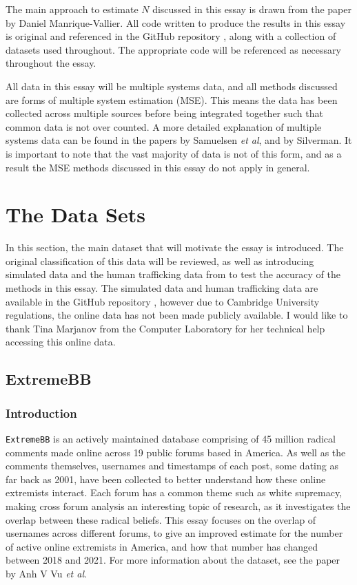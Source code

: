 \documentclass[10pt,a4paper,notitlepage]{article}
\begin{document}
The main approach to estimate $N$ discussed in this essay is drawn from the paper \cite{BayesianMixing} by Daniel Manrique-Vallier. All code written to produce the results in this essay is original and referenced in the GitHub repository \cite{Jonah}, along with a collection of datasets used throughout. The appropriate code will be referenced as necessary throughout the essay. 

All data in this essay will be multiple systems data, and all methods discussed are forms of multiple system estimation (MSE). This means the data has been collected across multiple sources before being integrated together such that common data is not over counted. A more detailed explanation of multiple systems data can be found in the papers \cite{Systems} by Samuelsen \textit{et al}, and \cite{Silver} by Silverman. It is important to note that the vast majority of data is not of this form, and as a result the MSE methods discussed in this essay do not apply in general.
\section{The Data Sets}\label{sc:2}
In this section, the main dataset that will motivate the essay is introduced. The original classification of this data will be reviewed, as well as introducing simulated data and the human trafficking data from \cite{Silver} to test the accuracy of the methods in this essay. The simulated data and human trafficking data are available in the GitHub repository \cite{Jonah}, however due to Cambridge University regulations, the online data has not been made publicly available. I would like to thank Tina Marjanov from the Computer Laboratory for her technical help accessing this online data.
\subsection{ExtremeBB}
\subsubsection*{Introduction}
\texttt{ExtremeBB} is an actively maintained database comprising of 45 million radical comments made online across 19 public forums based in America. As well as the comments themselves, usernames and timestamps of each post, some dating as far back as 2001, have been collected to better understand how these online extremists interact. Each forum has a common theme such as white supremacy, making cross forum analysis an interesting topic of research, as it investigates the overlap between these radical beliefs. This essay focuses on the overlap of usernames across different forums, to give an improved estimate for the number of active online extremists in America, and how that number has changed between 2018 and 2021. For more information about the dataset, see the paper \cite{ExtremeBB} by Anh V Vu \textit{et al}.
\end{document}
